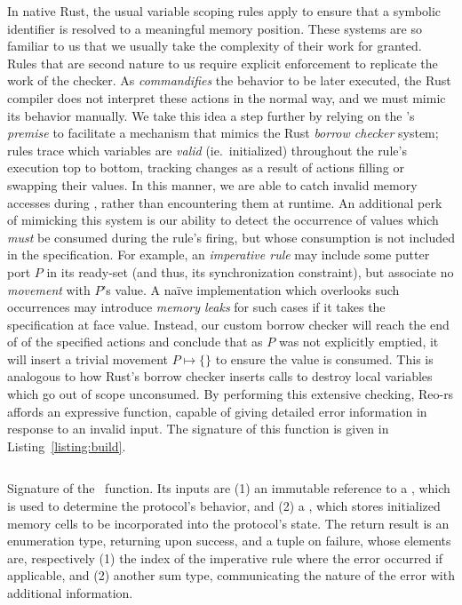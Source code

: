 In native Rust, the usual variable scoping rules apply to ensure that a symbolic identifier is resolved to a meaningful memory position. These systems are so familiar to us that we usually take the complexity of their work for granted. Rules that are second nature to us require explicit enforcement to replicate the work of the checker. As  \textit{commandifies} the behavior to be later executed, the Rust compiler does not interpret these actions in the normal way, and we must mimic its behavior manually. We take this idea a step further by relying on the 's \textit{premise} to facilitate a mechanism that mimics the Rust \textit{borrow checker} system; rules trace which variables are \textit{valid} (ie.\ initialized) throughout the rule's execution top to bottom, tracking changes as a result of actions filling or swapping their values. In this manner, we are able to catch invalid memory accesses during , rather than encountering them at runtime. An additional perk of mimicking this system is our ability to detect the occurrence of values which \textit{must} be consumed during the rule's firing, but whose consumption is not included in the specification. For example, an \textit{imperative rule} may include some putter port $P$ in its ready-set (and thus, its synchronization constraint), but associate no \textit{movement} with $P$'s value. A na\"ive implementation which overlooks such occurrences may introduce \textit{memory leaks} for such cases if it takes the specification at face value. Instead, our custom borrow checker will reach the end of of the specified actions and conclude that as $P$ was not explicitly emptied, it will insert a trivial movement $P\mapsto{} \{\}$ to ensure the value is consumed. This is analogous to how Rust's borrow checker inserts  calls to destroy local variables which go out of scope unconsumed. By performing this extensive checking, Reo-rs affords an expressive  function, capable of giving detailed error information in response to an invalid input. The signature of this function is given in Listing~\ref{listing:build}.


\begin{listing}[ht]
	\centering
	\inputminted[]{rust}{build.rs}
	\caption[TODO.]{Signature of the~ function. Its inputs are (1) an immutable reference to a , which is used to determine the protocol's behavior, and (2) a , which stores initialized memory cells to be incorporated into the protocol's state. The return result is an enumeration type, returning  upon success, and a tuple on failure, whose elements are, respectively (1) the index of the imperative rule where the error occurred if applicable, and (2) another sum type, communicating the nature of the error with additional information. }
	\label{listing:build}
\end{listing}

